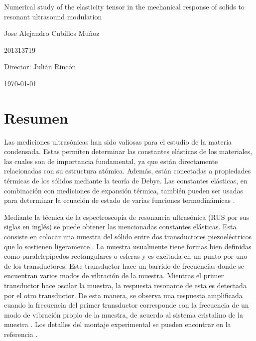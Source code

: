 \documentclass[12pt]{article}
\begin{document}
\begin{center}
\Huge
Numerical study of the elasticity tensor in the mechanical response of solids to resonant ultrasound modulation

\vspace{3mm}
\Large Jose Alejandro Cubillos Muñoz

\large
201313719


\vspace{2mm}
\Large
Director: Julián Rincón

\normalsize
\vspace{2mm}

\today
\end{center}


\normalsize

\section{Resumen}

Las mediciones ultrasónicas han sido valiosas para el estudio de la materia condensada. Estas permiten determinar las constantes elásticas de los materiales, las cuales son de importancia fundamental, ya que están directamente relacionadas con su estructura atómica. Además, están conectadas a propiedades térmicas de los sólidos mediante la teoría de Debye. Las constantes elásticas, en combinación con mediciones de expansión térmica, también pueden ser usadas para determinar la ecuación de estado de varias funciones termodinámicas \cite{Leisure_1997}.


Mediante la técnica de la espectroscopía de resonancia ultrasónica (RUS por sus siglas en inglés) se puede obtener las mencionadas constantes elásticas. Esta consiste en colocar una muestra del sólido entre dos transductores piezoeléctricos que lo sostienen ligeramente \cite{MIGLIORI19931}. La muestra usualmente tiene formas bien definidas como paralelepípedos rectangulares o esferas y es excitada en un punto por uno de los transductores. Este transductor hace un barrido de frecuencias donde se encuentran varios modos de vibración de la muestra. Mientras el primer transductor hace oscilar la muestra, la respuesta resonante de esta es detectada por el otro transductor. De esta manera, se observa una respuesta amplificada cuando la frecuencia del primer transductor corresponde con la frecuencia de un modo de vibración propio de la muestra, de acuerdo al sistema cristalino de la muestra \cite{Leisure_1997}. Los detalles del montaje experimental se pueden encontrar en la referencia \cite{MIGLIORI19931}.
\end{document}
